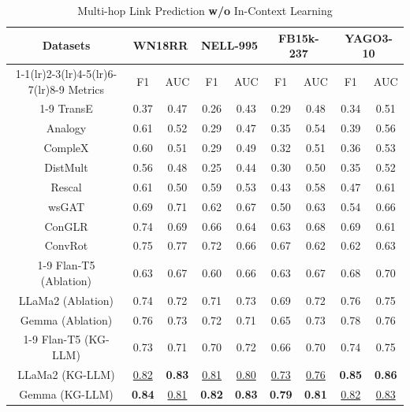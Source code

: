 \documentclass[pmlr]{jmlr}%
\begin{document}
\begin{table}[ht!]
\centering
\caption{Multi-hop Link Prediction \textbf{w/o} In-Context Learning}
\setlength{\tabcolsep}{2.5pt}
\begin{tabular}{ccccccccc}
\toprule
Datasets & \multicolumn{2}{c}{\textbf{WN18RR}} & \multicolumn{2}{c}{\textbf{NELL-995}} & \multicolumn{2}{c}{\textbf{FB15k-237}} & \multicolumn{2}{c}{\textbf{YAGO3-10}}\\ 
\cmidrule(lr){1-1}\cmidrule(lr){2-3}\cmidrule(lr){4-5}\cmidrule(lr){6-7}\cmidrule(lr){8-9}
Metrics & F1  & AUC  & F1  & AUC & F1  & AUC & F1  & AUC \\
\cmidrule{1-9}
TransE &0.37 &0.47 &0.26 &0.43 &0.29 & 0.48 & 0.34 & 0.51\\
Analogy &0.61 &0.52 &0.29 &0.47 &0.35 & 0.54 & 0.39 & 0.56\\
CompleX &0.60 &0.51 &0.29 &0.49 &0.32 & 0.51 & 0.36 & 0.53\\
DistMult &0.56 &0.48 &0.25 &0.44 &0.30 & 0.50 & 0.35 & 0.52\\
Rescal &0.61 &0.50 &0.59 &0.53 &0.43 & 0.58 & 0.47 & 0.61\\
wsGAT &0.69 &0.71 &0.62 &0.67 &0.50 & 0.63 & 0.54 & 0.66\\
ConGLR &0.74 &0.69 &0.66 &0.64 &0.63 & 0.68 & 0.69 & 0.61\\
ConvRot &0.75 &0.77 &0.72 &0.66 &0.67 & 0.62 & 0.62 & 0.63\\
\cmidrule{1-9}
Flan-T5 (Ablation) &0.63 &0.67 &0.60 &0.66 &0.63 & 0.67 & 0.68 & 0.70\\
LLaMa2 (Ablation) &0.74 &0.72 &0.71 &0.73 &0.69 & 0.72 & 0.76 & 0.75\\
Gemma (Ablation) &0.76 &0.73 &0.72 &0.71 &0.65 & 0.73 & 0.78 & 0.76\\
\cmidrule{1-9}
Flan-T5 (KG-LLM) & 0.73 & 0.71 & 0.70 & 0.72 & 0.66 & 0.70 & 0.74 & 0.75\\
LLaMa2 (KG-LLM) & \underline{0.82} & \bf0.83 & \underline{0.81} &\underline{0.80} & \underline{0.73} & \underline{0.76} & \textbf{0.85} & \textbf{0.86}\\
Gemma (KG-LLM) & \bf 0.84 & \underline{0.81} &\bf0.82 &\bf0.83 &\textbf{0.79} & \textbf{0.81} & \underline{0.82} & \underline{0.83}\\

\bottomrule
\end{tabular}
\label{link_without}
\end{table}
\end{document}
